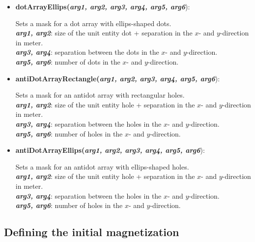 \begin{itemize}
 \item {\vspace{-0.4cm}\textbf{dotArrayEllips(\textit{arg1, arg2, arg3, arg4, arg5, arg6}}):
				\flushright\parbox{0.9 \textwidth}{\vspace{-0.25cm} 
				Sets a mask for a dot array with ellips-shaped dots.\\
				\textbf{\textit{arg1, arg2}}: size of the unit entity dot + separation in the $x$- and $y$-direction in meter.\\
				\textbf{\textit{arg3, arg4}}: separation between the dots in the $x$- and $y$-direction.\\
				\textbf{\textit{arg5, arg6}}: number of dots in the $x$- and $y$-direction.
				}\flushleft}

 \item {\vspace{-0.4cm}\textbf{antiDotArrayRectangle(\textit{arg1, arg2, arg3, arg4, arg5, arg6}}):
				\flushright\parbox{0.9 \textwidth}{\vspace{-0.25cm} 
				Sets a mask for an antidot array with rectangular holes.\\
				\textbf{\textit{arg1, arg2}}: size of the unit entity hole + separation in the $x$- and $y$-direction in meter.\\
				\textbf{\textit{arg3, arg4}}: separation between the holes in the $x$- and $y$-direction.\\
				\textbf{\textit{arg5, arg6}}: number of holes in the $x$- and $y$-direction.
				}\flushleft}

 \item {\vspace{-0.4cm}\textbf{antiDotArrayEllips(\textit{arg1, arg2, arg3, arg4, arg5, arg6}}):
				\flushright\parbox{0.9 \textwidth}{\vspace{-0.25cm} 
				Sets a mask for an antidot array with ellips-shaped holes.\\
				\textbf{\textit{arg1, arg2}}: size of the unit entity hole + separation in the $x$- and $y$-direction in meter.\\
				\textbf{\textit{arg3, arg4}}: separation between the holes in the $x$- and $y$-direction.\\
				\textbf{\textit{arg5, arg6}}: number of holes in the $x$- and $y$-direction.
				}\flushleft}

\end{itemize}


\subsection{Defining the initial magnetization}


